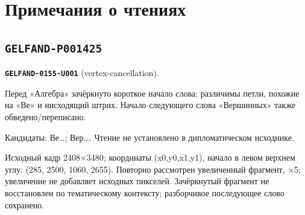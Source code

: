 \section*{Примечания о чтениях}
\subsection*{\texttt{GELFAND-P001425}}
\par\noindent\leavevmode{}\label{GELFAND-0155-U001}\label{GELFAND-P001425:vertex-cancellation}\textbf{\texttt{GELFAND-0155-U001}} (vertex-cancellation).\nopagebreak[4]\par
Перед «Алгебра» зачёркнуто короткое начало слова; различимы петли, похожие на «Ве» и нисходящий штрих. Начало следующего слова «Вершинных» также обведено/переписано.\par
Кандидаты: Ве…; Вер…. Чтение не установлено в дипломатическом исходнике.\par
Исходный кадр 2408×3480; координаты (x0,y0,x1,y1), начало в левом верхнем углу: (285, 2500, 1060, 2655). Повторно рассмотрен увеличенный фрагмент, ×5; увеличение не добавляет исходных пикселей. Зачёркнутый фрагмент не восстановлен по тематическому контексту; разборчивое последующее слово сохранено.\par
\medskip
